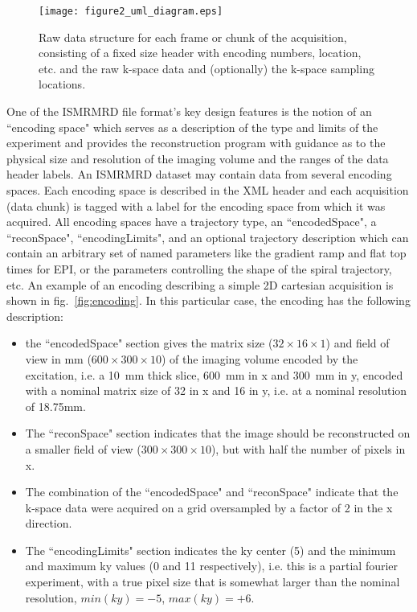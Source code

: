 \documentclass[12pt]{article}
\begin{document}
\begin{figure}
\begin{center}
\texttt{[image: figure2\_uml\_diagram.eps]}
\caption{Raw data structure for each frame or chunk of the acquisition, consisting of a fixed size header with encoding numbers, location, etc. and the raw k-space data and (optionally) the k-space sampling locations.}
\label{fig:cstruct}
\end{center}
\end{figure}

One of the ISMRMRD file format's key design features is the notion of an ``encoding space" which serves as a description of the type and limits of the experiment and provides the reconstruction program with guidance as to the physical size and resolution of the imaging volume and the ranges of the data header labels.  An ISMRMRD dataset may contain data from several encoding spaces.  Each encoding space is described in the XML header and each acquisition (data chunk) is tagged with a label for the encoding space from which it was acquired. All encoding spaces have a trajectory type, an ``encodedSpace", a ``reconSpace", ``encodingLimits", and an optional trajectory description which can contain an arbitrary set of named parameters like the gradient ramp and flat top times for EPI, or the parameters controlling the shape of the spiral trajectory, etc.  An example of an encoding describing a simple 2D cartesian acquisition is shown in fig.~\ref{fig:encoding}.  In this particular case, the encoding has the following description:
\begin{itemize}
\item the ``encodedSpace" section gives the matrix size ($32\times16\times1$) and field of view in mm ($600\times300\times10$) of the imaging volume encoded by the excitation, i.e. a 10~mm thick slice, 600~mm in x and 300~mm in y, encoded with a nominal matrix size of 32 in x and 16 in y, i.e. at a nominal resolution of 18.75mm.
\item The ``reconSpace" section indicates that the image should be reconstructed on a smaller field of view ($300\times300\times10$), but with half the number of pixels in x.
\item The combination of the ``encodedSpace" and ``reconSpace" indicate that the k-space data were acquired on a grid oversampled by a factor of 2 in the x direction.
\item The ``encodingLimits" section indicates the ky center (5) and the minimum and maximum ky values (0 and 11 respectively), i.e. this is a partial fourier experiment, with a true pixel size that is somewhat larger than the nominal resolution, $min(ky)=-5$, $max(ky)=+6$.
\end{itemize}
\end{document}
